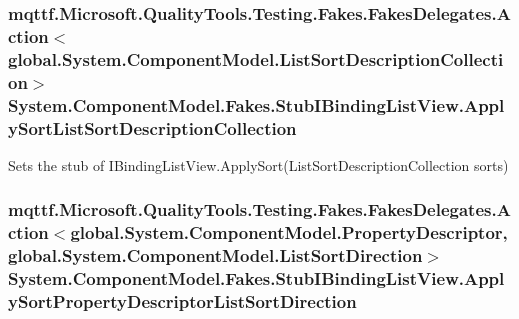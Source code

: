\hypertarget{class_system_1_1_component_model_1_1_fakes_1_1_stub_i_binding_list_view_a2490012b836d44f0e39e5cafc8017cd8}{
\subsubsection[{Apply\-Sort\-List\-Sort\-Description\-Collection}]{\setlength{\rightskip}{0pt plus 5cm}mqttf.\-Microsoft.\-Quality\-Tools.\-Testing.\-Fakes.\-Fakes\-Delegates.\-Action$<$global.\-System.\-Component\-Model.\-List\-Sort\-Description\-Collection$>$ System.\-Component\-Model.\-Fakes.\-Stub\-I\-Binding\-List\-View.\-Apply\-Sort\-List\-Sort\-Description\-Collection}}\label{class_system_1_1_component_model_1_1_fakes_1_1_stub_i_binding_list_view_a2490012b836d44f0e39e5cafc8017cd8}


Sets the stub of I\-Binding\-List\-View.\-Apply\-Sort(\-List\-Sort\-Description\-Collection sorts)

\hypertarget{class_system_1_1_component_model_1_1_fakes_1_1_stub_i_binding_list_view_ab681995d5f0e99d9f7ebb194bcc15fd1}{
\subsubsection[{Apply\-Sort\-Property\-Descriptor\-List\-Sort\-Direction}]{\setlength{\rightskip}{0pt plus 5cm}mqttf.\-Microsoft.\-Quality\-Tools.\-Testing.\-Fakes.\-Fakes\-Delegates.\-Action$<$global.\-System.\-Component\-Model.\-Property\-Descriptor, global.\-System.\-Component\-Model.\-List\-Sort\-Direction$>$ System.\-Component\-Model.\-Fakes.\-Stub\-I\-Binding\-List\-View.\-Apply\-Sort\-Property\-Descriptor\-List\-Sort\-Direction}}\label{class_system_1_1_component_model_1_1_fakes_1_1_stub_i_binding_list_view_ab681995d5f0e99d9f7ebb194bcc15fd1}


